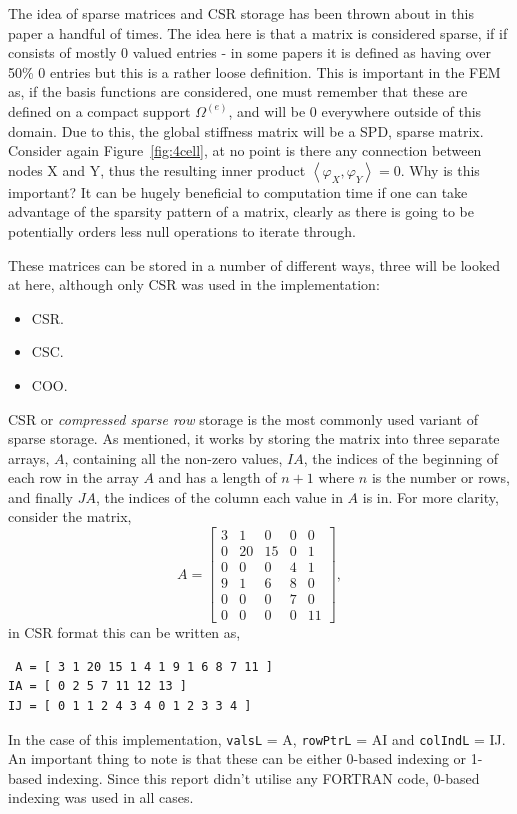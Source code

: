 The idea of sparse matrices and CSR storage has been thrown about in this paper a handful of times. The idea here is that a matrix is considered sparse, if if consists of mostly 0 valued entries - in some papers it is defined as having over 50\% 0 entries but this is a rather loose definition. This is important in the FEM as, if the basis functions are considered, one must remember that these are defined on a compact support $\Omega^{(e)}$, and will be 0 everywhere outside of this domain. Due to this, the global stiffness matrix will be a SPD, sparse matrix. Consider again Figure~\ref{fig:4cell}, at no point is there any connection between nodes X and Y, thus the resulting inner product $\left\langle\varphi_X,\varphi_Y\right\rangle=0$. Why is this important? It can be hugely beneficial to computation time if one can take advantage of the sparsity pattern of a matrix, clearly as there is going to be potentially orders less null operations to iterate through.

These matrices can be stored in a number of different ways, three will be looked at here, although only CSR was used in the implementation:
\begin{itemize}
	\item CSR.
	\item CSC.
	\item COO.
\end{itemize}
CSR or \textit{compressed sparse row} storage is the most commonly used variant of sparse storage. As mentioned, it works by storing the matrix into three separate arrays, $A$, containing all the non-zero values, $IA$, the indices of the beginning of each row in the array $A$ and has a length of $n+1$ where $n$ is the number or rows, and finally $JA$, the indices of the column each value in $A$ is in. For more clarity, consider the matrix,
\begin{equation}
	A = 
	\left[\begin{matrix}
		3 & 1 & 0 & 0 & 0\\
		0 & 20 & 15 & 0 & 1\\
		0 & 0 & 0 & 4 & 1\\
		9 & 1 & 6 & 8 & 0\\
		0 & 0 & 0 & 7 & 0\\
		0 & 0 & 0 & 0 & 11
	\end{matrix}\right],
\end{equation}
in CSR format this can be written as,
\begin{lstlisting}
 A = [ 3 1 20 15 1 4 1 9 1 6 8 7 11 ]
IA = [ 0 2 5 7 11 12 13 ]
IJ = [ 0 1 1 2 4 3 4 0 1 2 3 3 4 ]
\end{lstlisting}
In the case of this implementation, \texttt{valsL} = A, \texttt{rowPtrL} = AI and \texttt{colIndL} = IJ. An important thing to note is that these can be either 0-based indexing or 1-based indexing. Since this report didn't utilise any FORTRAN code, 0-based indexing was used in all cases.

